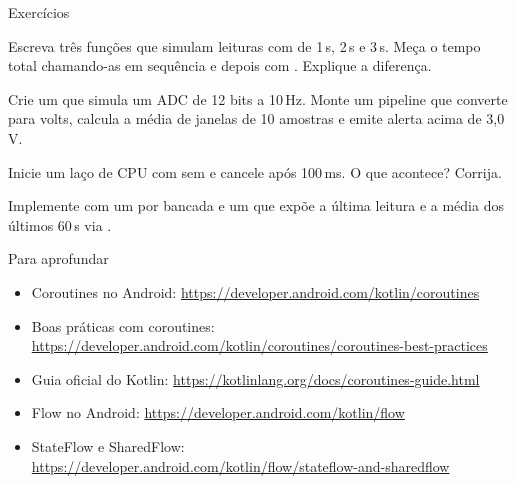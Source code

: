 \documentclass[aspectratio=169,10pt]{beamer}
\begin{document}
\begin{frame}{Exercícios}
  \begin{exercicio}
    Escreva três funções  que simulam leituras com  de 1\,s, 2\,s e 3\,s. Meça o tempo total chamando-as em sequência e depois com . Explique a diferença.
  \end{exercicio}
  \begin{exercicio}
    Crie um  que simula um ADC de 12 bits a 10\,Hz. Monte um pipeline que converte para volts, calcula a média de janelas de 10 amostras e emite alerta acima de 3,0\,V.
  \end{exercicio}
  \begin{exercicio}
    Inicie um laço de CPU com  sem  e cancele após 100\,ms. O que acontece? Corrija.
  \end{exercicio}
  \begin{projeto}
    Implemente  com um  por bancada e um  que expõe a última leitura e a média dos últimos 60\,s via .
  \end{projeto}
\end{frame}

\begin{frame}{Para aprofundar}
  \small
  \begin{itemize}
    \item Coroutines no Android: \url{https://developer.android.com/kotlin/coroutines}
    \item Boas práticas com coroutines: \url{https://developer.android.com/kotlin/coroutines/coroutines-best-practices}
    \item Guia oficial do Kotlin: \url{https://kotlinlang.org/docs/coroutines-guide.html}
    \item Flow no Android: \url{https://developer.android.com/kotlin/flow}
    \item StateFlow e SharedFlow: \url{https://developer.android.com/kotlin/flow/stateflow-and-sharedflow}
  \end{itemize}
\end{frame}
\end{document}

